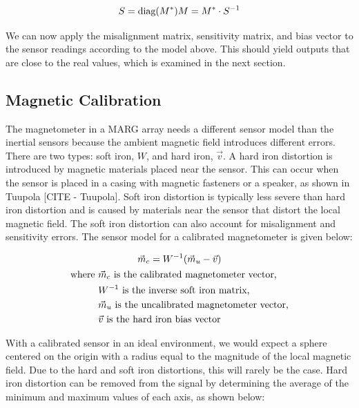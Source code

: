 \begin{equation*}
    S = \text{diag}(M^*) \\
    M=M^* \cdot S^{-1}
\end{equation*}

We can now apply the misalignment matrix, sensitivity matrix, and bias vector to the sensor readings according to the model above. This should yield outputs that are close to the real values, which is examined in the next section.

\subsection{Magnetic Calibration}
The magnetometer in a MARG array needs a different sensor model than the inertial sensors because the ambient magnetic field introduces different errors. 
There are two types: soft iron, $W$, and hard iron, $\vec{v}$. 
A hard iron distortion is introduced by magnetic materials placed near the sensor. 
This can occur when the sensor is placed in a casing with magnetic fasteners or a speaker, as shown in Tuupola [CITE - Tuupola]. 
Soft iron distortion is typically less severe than hard iron distortion and is caused by materials near the sensor that distort the local magnetic field. 
The soft iron distortion can also account for misalignment and sensitivity errors. 
The sensor model for a calibrated magnetometer is given below:

\begin{gather}
    \vec{m}_c=W^{-1}(\vec{m}_u-\vec{v}) \\
    \begin{aligned}
        \text{where } &\vec{m}_c \text{ is the calibrated magnetometer vector,} \\
        &W^{-1} \text{ is the inverse soft iron matrix,}\\
        &\vec{m}_u \text{ is the uncalibrated magnetometer vector,} \\
        &\vec{v} \text{ is the hard iron bias vector}
    \end{aligned} \notag
\end{gather}

With a calibrated sensor in an ideal environment, we would expect a sphere centered on the origin with a radius equal to the magnitude of the local magnetic field. 
Due to the hard and soft iron distortions, this will rarely be the case. 
Hard iron distortion can be removed from the signal by determining the average of the minimum and maximum values of each axis, as shown below:

